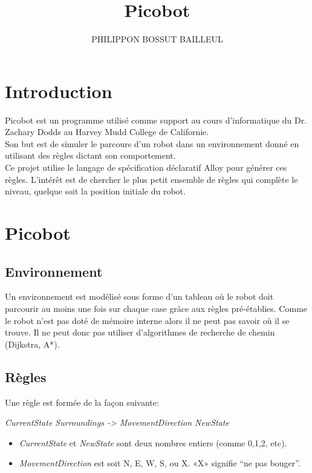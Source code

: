 \documentclass{article}
\begin{document}
\title{Picobot}

\author{PHILIPPON BOSSUT BAILLEUL}


\maketitle
\newpage
\tableofcontents

\newpage


\section{Introduction}
Picobot est un programme utilisé comme support au cours d'informatique
du Dr. Zachary Dodds au Harvey Mudd College de Californie.
\\

Son but est de simuler le parcours d’un robot dans un environnement
donné en utilisant des règles dictant son comportement.
\\

Ce projet utilise le langage de spécification déclaratif Alloy pour
générer ces règles. L'intérêt est de chercher le plus petit ensemble
de règles qui complète le niveau, quelque soit la position initiale du
robot.



\section{Picobot}
\subsection{Environnement}
Un environnement est modélisé sous forme d’un tableau où le robot doit
parcourir au moins une fois sur chaque case grâce aux règles
pré-établies.
Comme le robot n’est pas doté de mémoire interne alors il ne peut pas
savoir où il se trouve. Il ne peut donc pas utiliser d’algorithmes de
recherche de chemin (Dijkstra, A*).
\\
\subsection{Règles}
Une règle est formée de la façon suivante:

\textit{CurrentState Surroundings -> MovementDirection NewState}\\

\begin{itemize}
\item {\textit{CurrentState} et \textit{NewState} sont deux nombres entiers (comme 0,1,2,
  etc).}
\item {\textit{MovementDirection} est soit N, E, W, S, ou X. «X» signifie ``ne pas
bouger''.\\}
\end{itemize}
\end{document}
